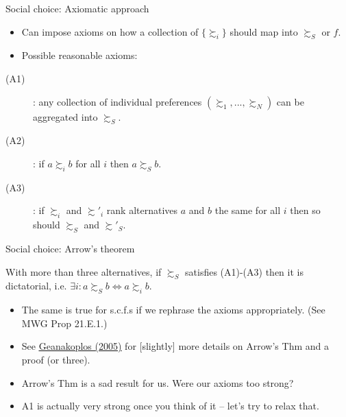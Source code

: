 \documentclass[english,10pt
,aspectratio=169
]{beamer}
\begin{document}
\begin{frame}{Social choice: Axiomatic approach}
	\begin{itemize}
		\item Can impose \alert{axioms} on how a collection of $\{\succsim_i\}$ should map into $\succsim_S$ or $f$.
		\item Possible reasonable axioms:
	\end{itemize}
	\begin{description}
		\item[(A1)] : any collection of individual preferences $\left(\succsim_1, ..., \succsim_N \right)$ can be aggregated into $\succsim_S$.
		\item[(A2)] : if $a \succsim_i b$ for all $i$ then $a \succsim_S b$.
		\item[(A3)] : if $\succsim_i$ and $\succsim'_i$ rank alternatives $a$ and $b$ the same for all $i$ then so should $\succsim_S$ and $\succsim'_S$.
	\end{description}
\end{frame}


\begin{frame}{Social choice: Arrow's theorem}
	\begin{theorem}[Arrow, 1950]
		With more than three alternatives, if $\succsim_S$ satisfies (A1)-(A3) then it is dictatorial, i.e. $\exists i: a \succsim_S b \Leftrightarrow a \succsim_i b$.
	\end{theorem}
	\begin{itemize}
		\item The same is true for s.c.f.s if we rephrase the axioms appropriately. (See MWG Prop 21.E.1.)
		\item See \href{https://link.springer.com/article/10.1007/s00199-004-0556-7}{\uline{Geanakoplos (2005)}} for [slightly] more details on Arrow's Thm and a proof (or three).
		\item Arrow's Thm is a sad result for us. Were our axioms too strong?
		\item A1 is actually very strong once you think of it -- let's try to relax that.
	\end{itemize}
\end{frame}
\end{document}
